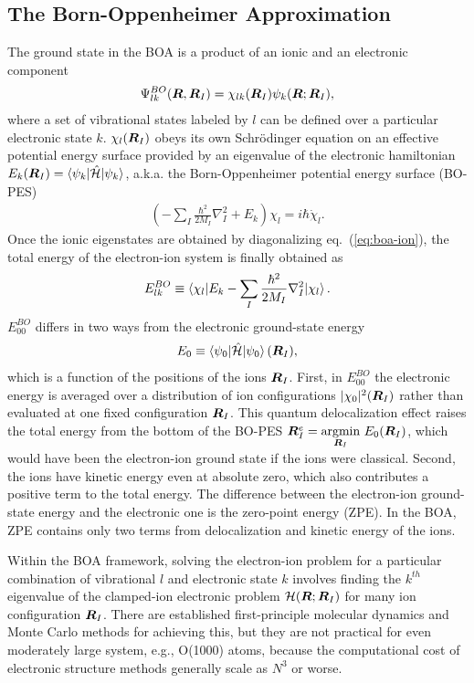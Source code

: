 \subsection{The Born-Oppenheimer Approximation}
The ground state in the BOA is a product of an ionic and an electronic component
\begin{align} \label{eq:intro-boa-product}
\Psi_{lk}^{BO}(\boldsymbol{R},\boldsymbol{R}_I) = \chi_{lk}(\boldsymbol{R}_I) \psi_k(\boldsymbol{R};\boldsymbol{R}_I),
\end{align}
where a set of vibrational states labeled by $l$ can be defined over a particular electronic state $k$. $\chi_l(\boldsymbol{R}_I)$ obeys its own Schr\"odinger equation on an effective potential energy surface provided by an eigenvalue of the electronic hamiltonian $E_k(\boldsymbol{R}_I) = \braket{\psi_k|\hat{\mathcal{H}}|\psi_k}$, a.k.a. the Born-Oppenheimer potential energy surface (BO-PES)
\begin{align} \label{eq:boa-ion}
\left(-\sum_I\frac{\hbar^2}{2M_I}\nabla^2_I+E_k\right)\chi_l = i\hbar\dot{\chi}_l.
\end{align}
Once the ionic eigenstates are obtained by diagonalizing eq.~(\ref{eq:boa-ion}), the total energy of the electron-ion system is finally obtained as
\begin{align}
E_{lk}^{BO} \equiv \braket{\chi_l| E_k -\sum_I\frac{\hbar^2}{2M_I}\nabla^2_I |\chi_l}.
\end{align}
$E_{00}^{BO}$ differs in two ways from the electronic ground-state energy
\begin{align}
E_0 \equiv \braket{\psi_0|\hat{\mathcal{H}}|\psi_0}(\boldsymbol{R}_I),
\end{align}
which is a function of the positions of the ions $\boldsymbol{R}_I$. First, in $E_{00}^{BO}$ the electronic energy is averaged over a distribution of ion configurations $\vert\chi_0\vert^2(\boldsymbol{R}_I)$ rather than evaluated at one fixed configuration $\boldsymbol{R}_I$. This quantum delocalization effect raises the total energy from the bottom of the BO-PES $\boldsymbol{R}_I^e=\underset{\boldsymbol{R}_I}{\text{argmin}}~E_0(\boldsymbol{R}_I)$, which would have been the electron-ion ground state if the ions were classical. Second, the ions have kinetic energy even at absolute zero, which also contributes a positive term to the total energy.
The difference between the electron-ion ground-state energy and the electronic one is the zero-point energy (ZPE). In the BOA, ZPE contains only two terms from delocalization and kinetic energy of the ions.

Within the BOA framework, solving the electron-ion problem for a particular combination of vibrational $l$ and electronic state $k$ involves finding the $k^{th}$ eigenvalue of the clamped-ion electronic problem $\mathcal{H}(\boldsymbol{R}; \boldsymbol{R}_I)$ for many ion configuration $\boldsymbol{R}_I$. There are established first-principle molecular dynamics and Monte Carlo methods for achieving this, but they are not practical for even moderately large system, e.g., O(1000) atoms, because the computational cost of electronic structure methods generally scale as $N^3$ or worse.


